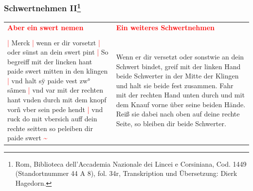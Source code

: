 \newpage

\begin{center}
\end{center}

\newpage

\subsubsection[Schwertnehmen II]{
    Schwertnehmen II\footnote{
        \hspace*{0.5ex}Rom, Biblioteca dell'Accademia Nazionale dei Lincei e Corsiniana,
        Cod. 1449 (Standortnummer 44 A 8), fol. 34r, Transkription und Übersetzung: Dierk Hagedorn.}}

\begin{longtable}{p{6.25cm}p{6.25cm}}
    \textbf{\textcolor{red}{
        Aber ein swert nemen}}
    &
    \textbf{\textcolor{red}{
        Ein weiteres Schwertnehmen}}
    \\
    \\
    \textcolor{red}{|} Merck
    \textcolor{red}{|} wenn er dir vorsetzt
    \textcolor{red}{|} oder sünst an dein swert pint
    \textcolor{red}{|} So begreiff mit der lincken hant paide swert mitten in den klingen
    \textcolor{red}{|} vnd halt sÿ paide vest zw° sãmen
    \textcolor{red}{|} vnd var mit der rechten hant vnden durch mit dem knopf vorñ vber sein pede hendt
    \textcolor{red}{|} vnd ruck do mit vbersich auff dein rechte seitten so peleiben dir paide swert \textcolor{red}{\textasciitilde{}}
    &
    Wenn er dir versetzt oder sonstwie an dein Schwert bindet, greif mit der linken Hand beide Schwerter in der Mitte der Klingen und halt sie beide fest zusammen.
    Fahr mit der rechten Hand unten durch und mit dem Knauf vorne über seine beiden Hände.
    Reiß sie dabei nach oben auf deine rechte Seite, so bleiben dir beide Schwerter.
\end{longtable}

\newpage

\begin{center}
\end{center}

\newpage
